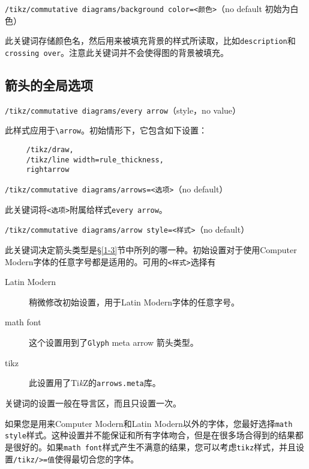 \documentclass{ctexart}
\begin{document}
\par{\color{red}\texttt{/tikz/commutative diagrams/background color=<颜色>}}\hfill （no default 初始为白色）
\par 此关键词存储颜色名，然后用来被填充背景的样式所读取，比如\verb|description|和\verb|crossing over|。注意此关键词并不会使得图的背景被填充。

\begin{tcblisting}{}
\end{tcblisting}
\subsection{箭头的全局选项}
{\color{red}\texttt{/tikz/commutative diagrams/every arrow}}\hfill （style，no value）
\par 此样式应用于\verb|\arrow|。初始情形下，它包含如下设置：
\begin{lstlisting}
     /tikz/draw,
     /tikz/line width=rule_thickness,
     rightarrow
\end{lstlisting}
\par{\color{red}\texttt{/tikz/commutative diagrams/arrows=<选项>}}\hfill （no default）\par
此关键词将\verb|<选项>|附属给样式\verb|every arrow|。\par
{\color{red}\texttt{/tikz/commutative diagrams/arrow style=<样式>}}\hfill （no default）\par
\par 此关键词决定箭头类型是\S\ref{1-3}节中所列的哪一种。初始设置对于使用Computer Modern字体的任意字号都是适用的。可用的\verb|<样式>|选择有
\begin{description}
\item[Latin Modern]稍微修改初始设置，用于Latin Modern字体的任意字号。
\item[math font]这个设置用到了\verb|Glyph| meta arrow 箭头类型。
\item[tikz]此设置用了Ti\emph{k}Z的\verb|arrows.meta|库。
\end{description}
关键词的设置一般在导言区，而且只设置一次。
\par 如果您是用来Computer Modern和Latin Modern以外的字体，您最好选择\verb|math style|样式。这种设置并不能保证和所有字体吻合，但是在很多场合得到的结果都是很好的。如果\verb|math font|样式产生不满意的结果，您可以考虑\verb|tikz|样式，并且设置\verb|/tikz/>=值|使得最切合您的字体。
\begin{tcblisting}{}
\end{tcblisting}
\end{document}
